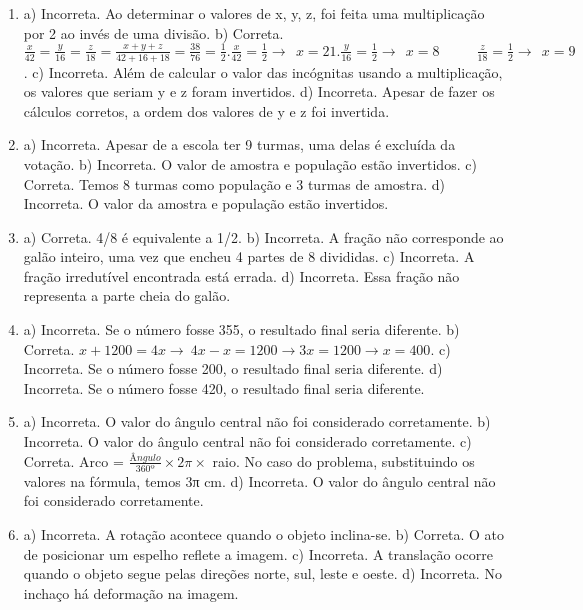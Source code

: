 \begin{enumerate}
\item a) Incorreta. Ao determinar o valores de x, y, z, foi feita uma multiplicação por 2 ao invés de uma divisão.
b) Correta. $\frac{x}{42} = \frac{y}{16} = \frac{z}{18} = \frac{x + y + z}{42 + 16 + 18} = \frac{38}{76} = \frac{1}{2}. \frac{x}{42} = \frac{1}{2} \rightarrow \ \ x = 21. \frac{y}{16} = \frac{1}{2} \rightarrow \ \ x = 8\ \ \ \ \ \ \ \ \ \ \ \ \frac{z}{18} = \frac{1}{2} \rightarrow \ \ x = 9$.
c) Incorreta. Além de calcular o valor das incógnitas usando a multiplicação, os valores que seriam y e z foram invertidos.
d) Incorreta. Apesar de fazer os cálculos corretos, a ordem dos valores de y e z foi invertida.

\item a) Incorreta. Apesar de a escola ter 9 turmas, uma delas é excluída da votação.
b) Incorreta. O valor de amostra e população estão invertidos.
c) Correta. Temos 8 turmas como população e 3 turmas de amostra.
d) Incorreta. O valor da amostra e população estão invertidos.


\item a)  Correta. 4/8 é equivalente a 1/2.
b)  Incorreta. A fração não corresponde ao galão inteiro, uma vez que encheu 4 partes de 8 divididas.
c) Incorreta. A fração irredutível encontrada está errada.
d) Incorreta. Essa fração não representa a parte cheia do galão.


\item a) Incorreta. Se o número fosse 355, o resultado final seria diferente.
b) Correta.
$x + 1200 = 4x \rightarrow \ 4x - x = 1200 \rightarrow 3x = 1200 \rightarrow x = 400$.
c) Incorreta. Se o número fosse 200, o resultado final seria diferente.
d) Incorreta. Se o número fosse 420, o resultado final seria diferente.

\item a) Incorreta. O valor do ângulo central não foi considerado corretamente.
b) Incorreta. O valor do ângulo central não foi considerado corretamente.
c) Correta. Arco = $\frac {Ângulo}{360º} \times 2π \times$ raio.
No caso do problema, substituindo os valores na fórmula, temos 3π cm.
d) Incorreta. O valor do ângulo central não foi considerado corretamente.

\item a) Incorreta. A rotação acontece quando o objeto inclina-se.
b) Correta. O ato de posicionar um espelho reflete a imagem.
c) Incorreta. A translação ocorre quando o objeto segue pelas direções norte, sul, leste e oeste.
d) Incorreta. No inchaço há deformação na imagem.



\end{enumerate}
